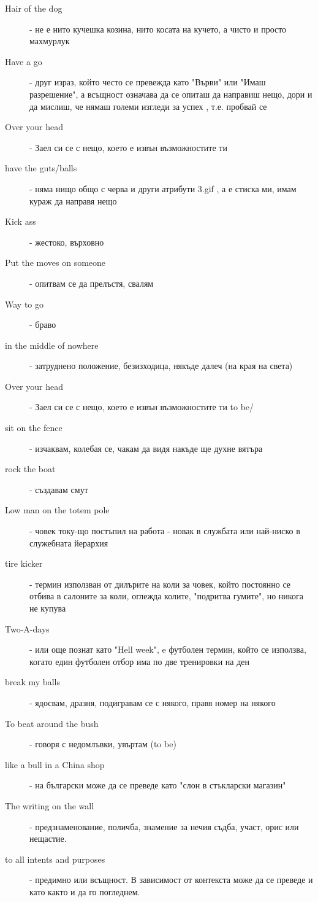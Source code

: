 \begin{description}
    \item[Hair of the dog] - не е нито кучешка козина, нито косата на кучето, а чисто и просто махмурлук
    \item[Have a go] - друг израз, който често се превежда като "Върви" или "Имаш разрешение",
    а всъщност означава да се опиташ да направиш нещо, дори и да мислиш, че нямаш големи изгледи за успех , т.е. пробвай се
    \item[Over your head] - Заел си се с нещо, което е извън възможностите ти
    \item[have the guts/balls] - няма нищо общо с черва и други атрибути 3.gif , а е стиска ми, имам кураж да направя нещо
    \item[Kick ass] - жестоко, върховно
    \item[Put the moves on someone] - опитвам се да прелъстя, свалям
    \item[Way to go] - браво
    \item[in the middle of nowhere] - затруднено положение, безизходица, някъде далеч (на края на света)
    \item[Over your head] - Заел си се с нещо, което е извън възможностите ти
    to be/\item[sit on the fence] - изчаквам, колебая се, чакам да видя накъде ще духне вятъра
    \item[rock the boat] - създавам смут
    \item[Low man on the totem pole] - човек току-що постъпил на работа - новак в службата или най-ниско в служебната йерархия
    \item[tire kicker] - термин използван от дилърите на коли за човек,
    който постоянно се отбива в салоните за коли, оглежда колите, "подритва гумите", но никога не купува
    \item[Two-A-days] - или още познат като "Hell week", e футболен термин, който се използва, когато един футболен отбор има по две тренировки на ден
    \item[break my balls] - ядосвам, дразня, подигравам се с някого, правя номер на някого
    \item[To beat around the bush] - говоря с недомлъвки, увъртам
    (to be)\item[ like a bull in a China shop] - на български може да се преведе като "слон в стъкларски магазин"
    \item[The writing on the wall] - предзнаменование, поличба, знамение за нечия съдба, участ, орис или нещастие.
    \item[to all intents and purposes] - предимно или всъщност. В зависимост от контекста може да се преведе и като както и да го погледнем.

\end{description}
